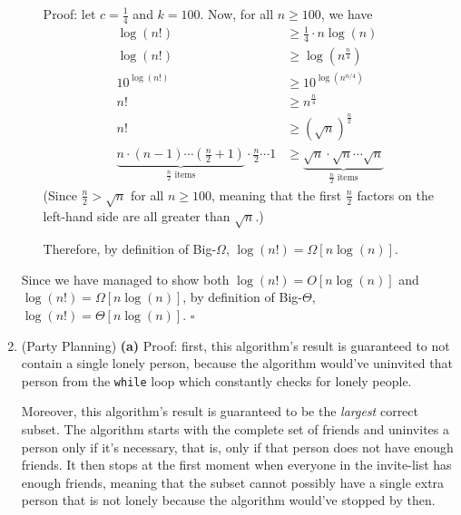 \documentclass{article}
\begin{document}
\begin{enumerate}
\begin{itemize}
        Proof: let $c = \frac{1}{4}$ and $k = 100$. Now, for all $n \ge 100$, we have
        $$
          \begin{aligned}
            \log(n!)      & \ge \frac{1}{4} \cdot n\log(n)                                                      \\
            \log(n!)      & \ge \log(n^{\frac{n}{4}})                                                           \\
            10^{\log(n!)} & \ge 10^{\log(n^{n/4})}                                                              \\
            n!            & \ge n^\frac{n}{4}                                                                   \\
            n!            & \ge (\sqrt{n})^{\frac{n}{2}}                                                        \\
            \underbrace{n \cdot (n-1) \cdots (\frac{n}{2}+1)}_{\frac{n}{2}\text{ items}}
            \cdot \frac{n}{2} \cdots 1
                          & \ge \underbrace{\sqrt{n} \cdot \sqrt{n} \cdots \sqrt{n}}_{\frac{n}{2}\text{ items}}
          \end{aligned}
        $$
        (Since $\frac{n}{2} > \sqrt{n}$ for all $n \ge 100$, meaning that the first $\frac{n}{2}$ factors on the left-hand side are all greater than $\sqrt{n}$.)

        Therefore, by definition of Big-$\Omega$, $\log(n!) = \Omega[n\log(n)]$.
    \end{itemize}

    Since we have managed to show both $\log(n!) = O[n\log(n)]$ and $\log(n!) = \Omega[n\log(n)]$, by definition of Big-$\Theta$, $\log(n!) = \Theta[n\log(n)]$. $\square$

    \pagebreak

  \item (Party Planning) \textbf{(a)} Proof: first, this algorithm's result is guaranteed to not contain a single lonely person, because the algorithm would've uninvited that person from the \texttt{while} loop which constantly checks for lonely people.

    Moreover, this algorithm's result is guaranteed to be the \textit{largest} correct subset. The algorithm starts with the complete set of friends and uninvites a person only if it's necessary, that is, only if that person does not have enough friends. It then stops at the first moment when everyone in the invite-list has enough friends, meaning that the subset cannot possibly have a single extra person that is not lonely because the algorithm would've stopped by then.


\end{enumerate}
\end{document}

